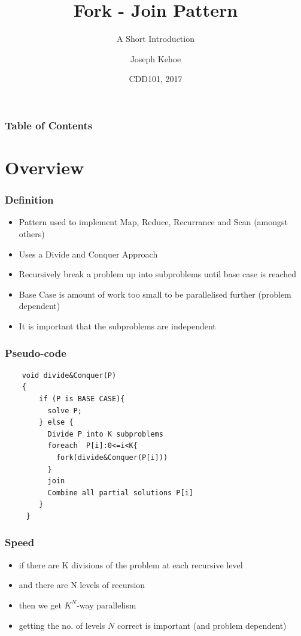 \documentclass{beamer}
\title[Reduce and Scan] %
{Fork - Join Pattern}
\subtitle{A Short Introduction}
\author[Dr. Joseph Kehoe] %
{Joseph Kehoe\inst{1}}
\institute[IT Carlow] %
{
	\inst{1}%
	Department of Computing and Networking\\
	Institute of Technology Carlow
}
\date[ITC 2017] %
{CDD101, 2017}
\begin{document}
 
\frame{\titlepage}
 
 
 
 \begin{frame}
 	\frametitle{Table of Contents}
 	\tableofcontents
 \end{frame}
 
 
 \section{Overview}
\begin{frame}
\frametitle{Definition}

\begin{itemize}
	\item Pattern used to implement Map, Reduce, Recurrance and Scan (amongst others)
	\item Uses a Divide and Conquer Approach
	\item Recursively break a problem up into subproblems until base case is reached
	\item Base Case is amount of work too small to be parallelised further (problem dependent)
	\item It is important that the subproblems are independent
\end{itemize}
\end{frame}


 \begin{frame}[fragile=singleslide]
 	\frametitle{Pseudo-code}
\begin{lstlisting}
 	void divide&Conquer(P)
 	{
	 	if (P is BASE CASE){
	 	  solve P;
	 	} else {
	 	  Divide P into K subproblems
	 	  foreach  P[i]:0<=i<K{
	 	    fork(divide&Conquer(P[i]))
	 	  }
	 	  join
	 	  Combine all partial solutions P[i] 
	 	}
	 }
 \end{lstlisting}
 \end{frame}
 
\begin{frame}
	\frametitle{Speed}
\begin{itemize}
\item if there are K divisions of the problem at each recursive level
\item and there are N levels of recursion
\item then we get $K^{N}$-way parallelism
\item getting the no. of levels $N$ correct is important (and problem dependent)
\end{itemize}
\end{frame}
\end{document}
